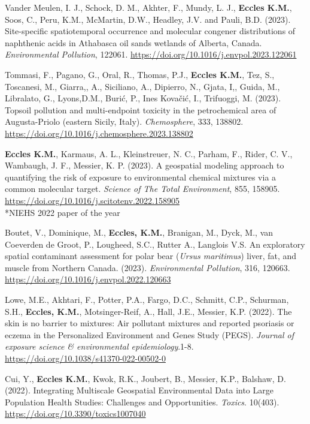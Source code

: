 \documentclass[margin,line]{res}
\begin{document}
\begin{resume}
Vander Meulen, I. J., Schock, D. M., Akhter, F., Mundy, L. J., \textbf{Eccles K.M.}, Soos, C., Peru, K.M., McMartin, D.W., Headley, J.V. and Pauli, B.D. (2023). Site-specific spatiotemporal occurrence and molecular congener distributions of naphthenic acids in Athabasca oil sands wetlands of Alberta, Canada. \textit{Environmental Pollution}, 122061. \url{https://doi.org/10.1016/j.envpol.2023.122061}

Tommasi, F., Pagano, G., Oral, R., Thomas, P.J., \textbf{Eccles K.M.}, Tez, S., Toscanesi, M., Giarra,, A., Siciliano, A., Dipierro, N., Gjata, I,, Guida, M., Libralato, G., Lyons,D.M., Burić, P., Ines Kovačić, I.,  Trifuoggi, M. (2023). Topsoil pollution and multi-endpoint toxicity in the petrochemical area of Augusta-Priolo (eastern Sicily, Italy). \textit{Chemosphere}, 333, 138802. \url{https://doi.org/10.1016/j.chemosphere.2023.138802}

\textbf{Eccles K.M.}, Karmaus, A. L., Kleinstreuer, N. C., Parham, F., Rider, C. V., Wambaugh, J. F., Messier, K. P. (2023). A geospatial modeling approach to quantifying the risk of exposure to environmental chemical mixtures via a common molecular target. \textit{Science of The Total Environment}, 855, 158905. \url{https://doi.org/10.1016/j.scitotenv.2022.158905}\\
\mbox{*}NIEHS 2022 paper of the year

Boutet, V., Dominique, M., \textbf{Eccles, K.M.}, Branigan, M., Dyck, M., van Coeverden de Groot, P., Lougheed, S.C., Rutter A., Langlois V.S. An exploratory spatial contaminant assessment for polar bear (\textit{Ursus maritimus}) liver, fat, and muscle from Northern Canada. (2023). \textit{Environmental Pollution}, 316, 120663. \url{https://doi.org/10.1016/j.envpol.2022.120663}

Lowe, M.E., Akhtari, F., Potter, P.A., Fargo, D.C., Schmitt, C.P., Schurman, S.H., \textbf{Eccles, K.M.}, Motsinger-Reif, A., Hall, J.E., Messier, K.P. (2022). The skin is no barrier to mixtures: Air pollutant mixtures and reported
psoriasis or eczema in the Personalized Environment and Genes Study (PEGS). \textit{Journal of exposure science \& environmental epidemiology}.1-8. \url{https://doi.org/10.1038/s41370-022-00502-0}

Cui, Y., \textbf{Eccles K.M.}, Kwok, R.K., Joubert, B., Messier, K.P., Balshaw, D. (2022). Integrating Multiscale Geospatial Environmental Data into Large Population Health Studies: Challenges and Opportunities. \textit{Toxics}. 10(403). \url{https://doi.org/10.3390/toxics1007040}


\end{resume}
\end{document}

